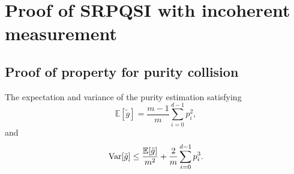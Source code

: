 \section{Proof of SRPQSI with incoherent measurement}

\subsection{Proof of property for purity collision}
    \begin{lemma} \label{lem:purity_collision_property}
        The expectation and variance of the purity estimation satisfying
        \begin{equation}
            \mathbb{E} [\tilde{g}]  = \frac{m-1}{m}\sum_{i=0}^{d-1} p_i^2,    
        \end{equation}
        and
        \begin{equation}
            \mathrm{Var}[\tilde{g}] \leq \frac{\mathbb{E} [\tilde{g}]}{m^2} + \frac{2}{m} \sum_{i=0}^{d-1} p_i^3.
        \end{equation}
    \end{lemma}
